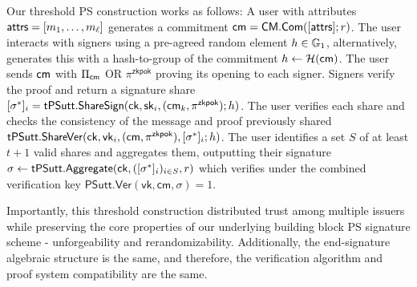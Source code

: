 Our threshold PS construction works as follows:
A user with attributes $\mathsf{attrs} = [m_1, \ldots, m_\ell]$ generates a commitment $\mathsf{cm} = \mathsf{CM.Com}([\mathsf{attrs}];r)$. The user interacts with signers using a pre-agreed random element $h \in \mathbb{G}_1$, alternatively, \cite{sonnino_coconut_2020} generates this with a hash-to-group of the commitment $h \gets \mathcal{H}(\mathsf{cm})$. The user sends $\mathsf{cm}$ with $\Pi_{\mathsf{cm}}$ OR $\pi^{\mathsf{zkpok}}$ proving its opening to each signer. Signers verify the proof and return a signature share $[\sigma^*]_i = \mathsf{tPSutt.ShareSign}(\mathsf{ck}, \mathsf{sk}_i, (\mathsf{cm}_k, \pi^{\mathsf{zkpok}}); h)$. The user verifies each share and checks the consistency of the message and proof previously shared $\mathsf{tPSutt.ShareVer}(\mathsf{ck}, \mathsf{vk}_i, (\mathsf{cm}, \pi^{\mathsf{zkpok}}), [\sigma^*]_i; h)$. The user identifies a set $S$ of at least $t+1$ valid shares and aggregates them, outputting their signature $\sigma \leftarrow \mathsf{tPSutt.Aggregate}(\mathsf{ck}, ([\sigma^*]_i)_{i \in S}, r)$ which verifies under the combined  verification key $\mathsf{PSutt.Ver}(\mathsf{vk}, \mathsf{cm}, \sigma) = 1$.

Importantly, this threshold construction distributed trust among multiple issuers while preserving the core properties of our underlying building block PS signature scheme - unforgeability and rerandomizability. Additionally, the end-signature algebraic structure is the same, and therefore, the verification algorithm and proof system compatibility are the same. 



